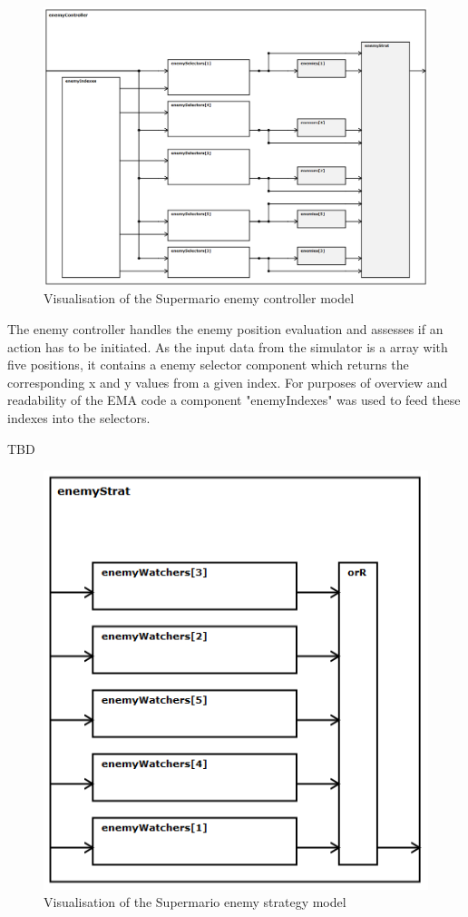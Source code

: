 \begin{figure}
	\centering
	\includegraphics[scale=0.4]{pictures/haller_enemycontroller.PNG}
	\caption{Visualisation of the Supermario enemy controller model}
	\label{fig:marioEnemyController}
\end{figure}

The enemy controller handles the enemy position evaluation and assesses if an action has to be initiated. As the input data from the simulator is a array with five positions, it contains a enemy selector component which returns the corresponding x and y values from a given index. For purposes of overview and readability of the EMA code a component "enemyIndexes" was used to feed these indexes into the selectors.

TBD

\begin{figure}
	\centering
	\includegraphics[scale=0.4]{pictures/haller_enemystrategy.PNG}
	\caption{Visualisation of the Supermario enemy strategy model}
	\label{fig:marioEnemyStrategy}
\end{figure}

